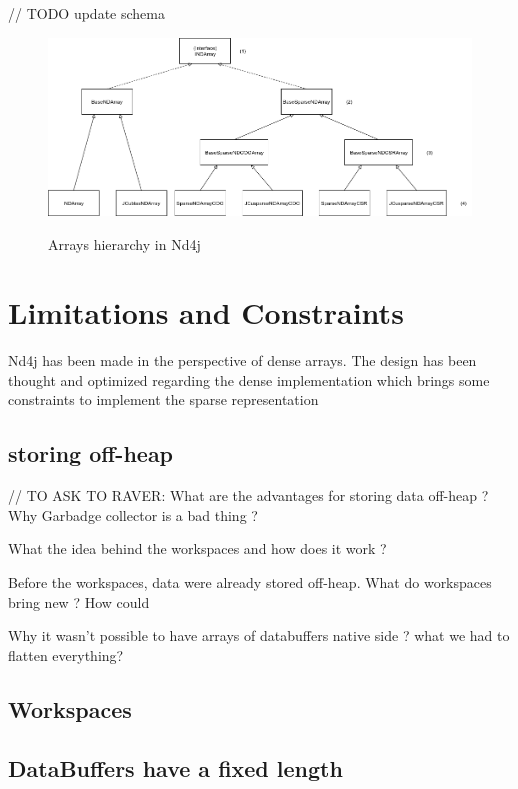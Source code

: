 // TODO update schema
 
\begin{figure}[H]
	\begin{center}
		\includegraphics[width=6.5in]{images/INDArrayHierarchy.png} 
		\label{fig:hierarchy}
		\caption{Arrays hierarchy in Nd4j}
	\end{center}
\end{figure}


\section{Limitations and Constraints}

Nd4j has been made in the perspective of dense arrays. The design has been thought and optimized regarding the dense implementation which brings some constraints to implement the sparse representation
\subsection{storing off-heap}

// TO ASK TO RAVER:
What are the advantages for storing data off-heap ? Why Garbadge collector is a bad thing ?

What the idea behind the workspaces and how does it work ?

Before the workspaces, data were already stored off-heap. What do workspaces bring new ? How could 

Why it wasn't possible to have arrays of databuffers native side ? what we had to flatten everything?


\subsection{Workspaces}
\subsection{DataBuffers have a fixed length}

